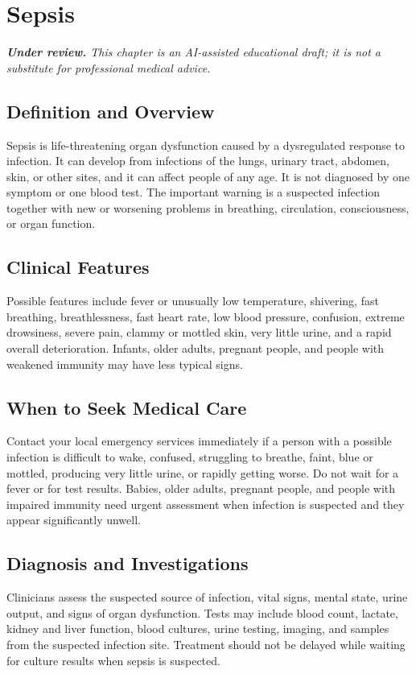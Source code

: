 \chapter{Sepsis}

\medskip
\noindent\textit{\textbf{Under review.} This chapter is an AI-assisted educational draft; it is not a substitute for professional medical advice.}

\section*{Definition and Overview}
Sepsis is life-threatening organ dysfunction caused by a dysregulated response to infection. It can develop from infections of the lungs, urinary tract, abdomen, skin, or other sites, and it can affect people of any age. It is not diagnosed by one symptom or one blood test. The important warning is a suspected infection together with new or worsening problems in breathing, circulation, consciousness, or organ function.

\section*{Clinical Features}
Possible features include fever or unusually low temperature, shivering, fast breathing, breathlessness, fast heart rate, low blood pressure, confusion, extreme drowsiness, severe pain, clammy or mottled skin, very little urine, and a rapid overall deterioration. Infants, older adults, pregnant people, and people with weakened immunity may have less typical signs.

\section*{When to Seek Medical Care}
Contact your local emergency services immediately if a person with a possible infection is difficult to wake, confused, struggling to breathe, faint, blue or mottled, producing very little urine, or rapidly getting worse. Do not wait for a fever or for test results. Babies, older adults, pregnant people, and people with impaired immunity need urgent assessment when infection is suspected and they appear significantly unwell.

\section*{Diagnosis and Investigations}
Clinicians assess the suspected source of infection, vital signs, mental state, urine output, and signs of organ dysfunction. Tests may include blood count, lactate, kidney and liver function, blood cultures, urine testing, imaging, and samples from the suspected infection site. Treatment should not be delayed while waiting for culture results when sepsis is suspected.

